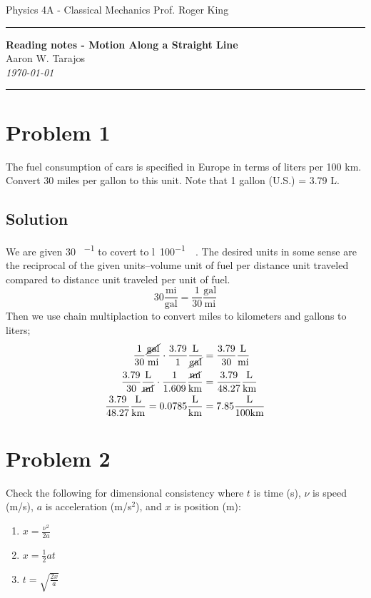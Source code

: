 \documentclass{article}
\newcommand{\mile}{\text{mi}}
\newcommand{\gallon}{\text{gal}}
\newcommand{\kilo}{\text{k}}
\newcommand{\liter}{\text{L}}
\newcommand{\meter}{\text{m}}
\begin{document}
\noindent
Physics 4A - Classical Mechanics \hfill Prof. Roger King

\noindent\rule{\textwidth}{0.4pt}

\begin{center}
    \textbf{\LARGE Reading notes - Motion Along a Straight Line} \\
    \vspace{12pt}
    \large Aaron W. Tarajos \\
    \textit{\today}
\end{center}

\noindent\rule{\textwidth}{0.4pt}

\section*{Problem 1}
The fuel consumption of cars is specified in Europe in terms of liters per 100 km. Convert
30 miles per gallon to this unit. Note that 1 gallon (U.S.) = 3.79 L.

\subsection*{Solution}
We are given 30 \si{{\mile\per\gallon}} to covert to \si{{\litre\per100\kilo\meter}}. The desired units in some sense are the reciprocal of the given units--volume unit of fuel per distance unit traveled compared to distance unit traveled per unit of fuel.
\[
	30 \frac{\mile}{\gallon} = \frac{1}{30} \frac{\text{gal}}{\mile}
\]
Then we use chain multiplaction to convert miles to kilometers and gallons to liters;
\begin{align*}
	\frac{1}{30} \frac{\cancel{\gallon}}{\mile} \cdot \frac{3.79}{1} \frac{\liter}{\cancel{\gallon}} &= \frac{3.79}{30} \frac{\liter}{\mile} \\
	\frac{3.79}{30} \frac{\liter}{\cancel{\mile}} \cdot \frac{1}{1.609} \frac{\cancel{\mile}}{\kilo\meter} &= \frac{3.79}{48.27} \frac{\liter}{\kilo\meter} \\
	\frac{3.79}{48.27} \frac{\liter}{\kilo\meter} = 0.0785 \frac{\liter}{\kilo\meter} &= 7.85 \frac{\liter}{100 \kilo\meter}
\end{align*}

\section*{Problem 2}
Check the following for dimensional consistency where $t$ is time (s), $\nu$ is speed (m/s), $a$ is acceleration (m/s$^2$), and $x$ is position (m):
\begin{enumerate}
	\item $x = \frac{\nu^2}{2a}$
	\item $x = \frac{1}{2}at$
	\item $t = \sqrt{\frac{2x}{a}}$
\end{enumerate}
\end{document}
